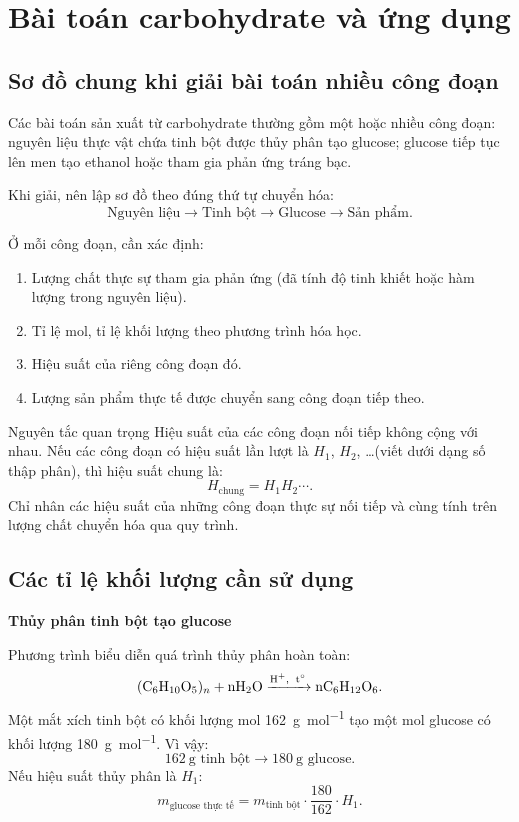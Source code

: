 \section{Bài toán carbohydrate và ứng dụng}

\subsection{Sơ đồ chung khi giải bài toán nhiều công đoạn}

Các bài toán sản xuất từ carbohydrate thường gồm một hoặc nhiều công đoạn: nguyên liệu thực vật chứa tinh bột được thủy phân tạo glucose; glucose tiếp tục lên men tạo ethanol hoặc tham gia phản ứng tráng bạc.

Khi giải, nên lập sơ đồ theo đúng thứ tự chuyển hóa:
\[
\text{Nguyên liệu}
\longrightarrow \text{Tinh bột}
\longrightarrow \text{Glucose}
\longrightarrow \text{Sản phẩm}.
\]

Ở mỗi công đoạn, cần xác định:
\begin{enumerate}
\item Lượng chất thực sự tham gia phản ứng (đã tính độ tinh khiết hoặc hàm lượng trong nguyên liệu).
\item Tỉ lệ mol, tỉ lệ khối lượng theo phương trình hóa học.
\item Hiệu suất của riêng công đoạn đó.
\item Lượng sản phẩm thực tế được chuyển sang công đoạn tiếp theo.
\end{enumerate}

\begin{ghinho}{Nguyên tắc quan trọng}
Hiệu suất của các công đoạn nối tiếp không cộng với nhau. Nếu các công đoạn có hiệu suất lần lượt là $H_1$, $H_2$, \ldots (viết dưới dạng số thập phân), thì hiệu suất chung là:
\[
H_{\text{chung}}=H_1H_2\cdots.
\]
Chỉ nhân các hiệu suất của những công đoạn thực sự nối tiếp và cùng tính trên lượng chất chuyển hóa qua quy trình.
\end{ghinho}

\subsection{Các tỉ lệ khối lượng cần sử dụng}

\textbf{Thủy phân tinh bột tạo glucose}

Phương trình biểu diễn quá trình thủy phân hoàn toàn:
\[
\ce{(C6H10O5)_n + nH2O ->[H^+,\ t^\circ] nC6H12O6}.
\]
Một mắt xích tinh bột có khối lượng mol \SI{162}{\gram\per\mole} tạo một mol glucose có khối lượng \SI{180}{\gram\per\mole}. Vì vậy:
\[
162\ \text{g tinh bột}\longrightarrow180\ \text{g glucose}.
\]
Nếu hiệu suất thủy phân là $H_1$:
\[
m_{\text{glucose thực tế}}
=m_{\text{tinh bột}}\cdot\frac{180}{162}\cdot H_1.
\]

